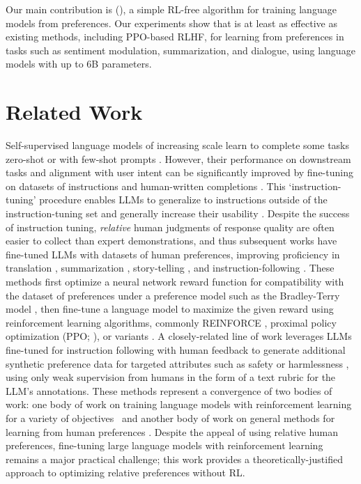 Our main contribution is {\methodfull} (\methodac), a simple RL-free algorithm for training language models from preferences. Our experiments show that {\methodac} is at least as effective as existing methods, including PPO-based RLHF, for learning from preferences in tasks such as sentiment modulation, summarization, and dialogue, using language models with up to 6B parameters.

\section{Related Work}

Self-supervised language models of increasing scale learn to complete some tasks zero-shot \citep{radford2019language} or with few-shot prompts \citep{gpt3,megatron,chowdhery2022palm}. However, their performance on downstream tasks and alignment with user intent can be significantly improved by fine-tuning on datasets of instructions and human-written completions \citep{mishra-etal-2022-cross,sanh2022multitask,chung2022scaling,thoppilan2022lamda}. This `instruction-tuning' procedure
enables LLMs to generalize to instructions outside of the instruction-tuning set and generally increase their usability \citep{chung2022scaling}. Despite the success of instruction tuning, \textit{relative} human judgments of response quality are often easier to collect than expert demonstrations, and thus subsequent works have fine-tuned LLMs with datasets of human preferences, improving proficiency in translation \citep{kreutzer-etal-2018-reliability}, summarization \citep{stiennon2022learning,ziegler2020finetuning}, story-telling \citep{ziegler2020finetuning}, and instruction-following \citep{ouyang2022training,ramamurthy2023is}. These methods first optimize a neural network reward function for compatibility with the dataset of preferences under a preference model such as the Bradley-Terry model \citep{bradley1952rankanalysis}, then fine-tune a language model to maximize the given reward using reinforcement learning algorithms, commonly REINFORCE \citep{williams1992reinforce}, proximal policy optimization (PPO; \cite{schulman2017proximal}), or variants \citep{ramamurthy2023is}. A closely-related line of work leverages LLMs fine-tuned for instruction following with human feedback to generate additional synthetic preference data for targeted attributes such as safety or harmlessness \citep{bai2022constitutional}, using only weak supervision from humans in the form of a text rubric for the LLM's annotations. These methods represent a convergence of two bodies of work: one body of work on training language models with reinforcement learning for a variety of objectives~\citep{Ranzato2015SequenceLT,paulus2018a,wu2018learning} and another body of work on general methods for learning from human preferences \citep{christiano2017deep,kupcsik2018learning}. 
Despite the appeal of using relative human preferences, fine-tuning large language models with reinforcement learning remains a major practical challenge; this work provides a theoretically-justified approach to optimizing relative preferences without RL.

